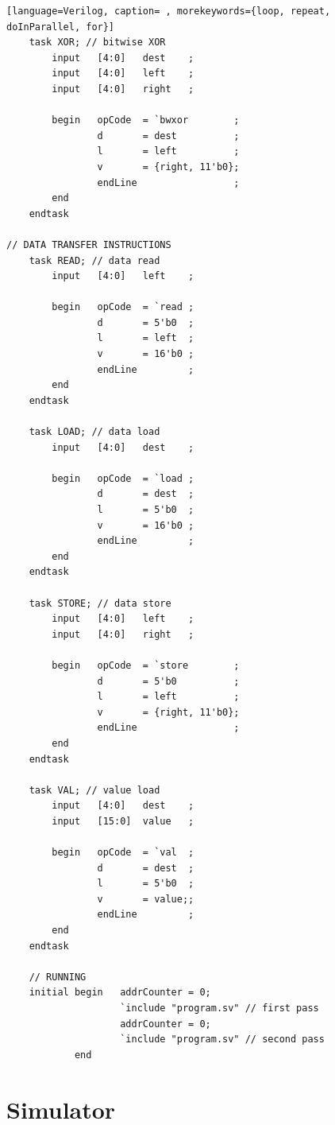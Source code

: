 {\begin{shaded*}
\begin{lstlisting}[language=Verilog, caption= , morekeywords={loop, repeat, doInParallel, for}]
    task XOR; // bitwise XOR
        input   [4:0]   dest    ;
        input   [4:0]   left    ;
        input   [4:0]   right   ;

        begin   opCode  = `bwxor        ;
                d       = dest          ;
                l       = left          ;
                v       = {right, 11'b0};
                endLine                 ;
        end
    endtask

// DATA TRANSFER INSTRUCTIONS
    task READ; // data read
        input   [4:0]   left    ;

        begin   opCode  = `read ;
                d       = 5'b0  ;
                l       = left  ;
                v       = 16'b0 ;
                endLine         ;
        end
    endtask

    task LOAD; // data load
        input   [4:0]   dest    ;

        begin   opCode  = `load ;
                d       = dest  ;
                l       = 5'b0  ;
                v       = 16'b0 ;
                endLine         ;
        end
    endtask

    task STORE; // data store
        input   [4:0]   left    ;
        input   [4:0]   right   ;

        begin   opCode  = `store        ;
                d       = 5'b0          ;
                l       = left          ;
                v       = {right, 11'b0};
                endLine                 ;
        end
    endtask

    task VAL; // value load
        input   [4:0]   dest    ;
        input   [15:0]  value   ;

        begin   opCode  = `val  ;
                d       = dest  ;
                l       = 5'b0  ;
                v       = value;;
                endLine         ;
        end
    endtask

    // RUNNING
    initial begin   addrCounter = 0;
                    `include "program.sv" // first pass
                    addrCounter = 0;
                    `include "program.sv" // second pass
            end
\end{lstlisting}
\end{shaded*}
}

\section{Simulator}

